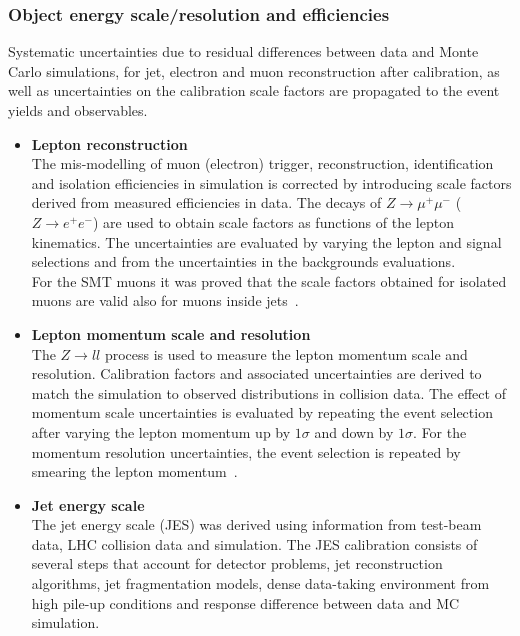 \subsubsection{Object energy scale/resolution and efficiencies} 
Systematic uncertainties due to residual differences between data and
Monte Carlo simulations, for jet, electron and muon reconstruction
after calibration, as well as uncertainties on the calibration scale
factors are propagated to the event yields and observables.

\begin{itemize}
	\item \textbf{Lepton reconstruction} \\ 
	The mis-modelling of muon (electron) trigger, reconstruction,
	identification and isolation efficiencies in simulation is corrected by introducing
	scale factors derived from measured efficiencies in data. The decays
	of $Z \to \mu^+ \mu^-$ ($Z \to e^+ e^-$) are used to obtain scale
	factors as functions of the lepton kinematics. The uncertainties are
	evaluated by varying the lepton and signal selections and from the
	uncertainties in the backgrounds evaluations. \\
	For the SMT muons it was proved that the scale factors obtained for
	isolated muons are valid also for muons inside jets~\cite{SMT-INT-13TeV}. 
	\item \textbf{Lepton momentum scale and resolution} \\ 
	The $Z \to ll$ process is used to measure the lepton momentum scale
	and resolution. Calibration factors and associated uncertainties are
	derived to match the simulation to observed distributions in collision
	data. The effect of momentum scale uncertainties is evaluated by
	repeating the event selection after varying the lepton momentum up by
	$1\sigma$ and down by $1\sigma$. For the momentum resolution
	uncertainties, the event selection is repeated by smearing the lepton
	momentum~\cite{PERF-2013-05}.
	\item \textbf{Jet energy scale} \\ 
	The jet energy scale (JES) was derived using information from test-beam data, LHC
	collision data and simulation. The JES calibration consists of several
	steps that account for detector problems, jet reconstruction
	algorithms, jet fragmentation models, dense data-taking environment
	from high pile-up conditions and response difference between data and
	MC simulation. 

\end{itemize}
